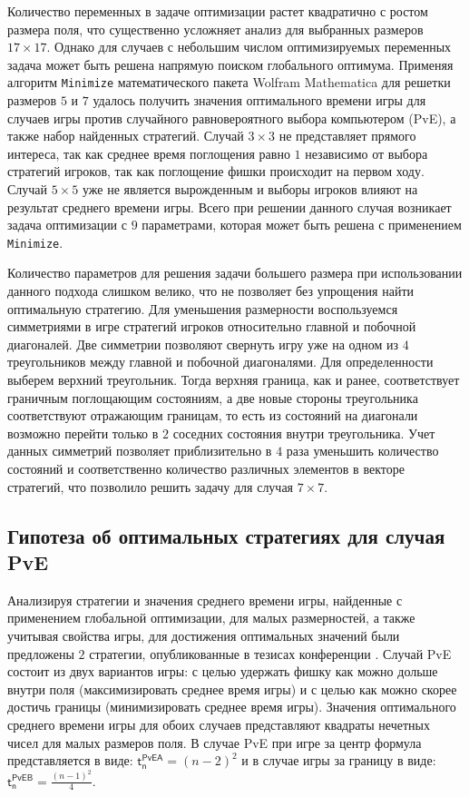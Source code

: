 Количество переменных в задаче оптимизации растет квадратично с ростом размера поля, что существенно усложняет анализ для выбранных размеров $17 \times 17$. Однако для случаев с небольшим числом оптимизируемых переменных задача может быть решена напрямую поиском глобального оптимума. Применяя алгоритм \texttt{Minimize} математического пакета Wolfram Mathematica для решетки размеров $5$ и $7$ удалось получить значения оптимального времени игры для случаев игры против случайного равновероятного выбора компьютером (PvE), а также набор найденных стратегий. Случай $3 \times 3$ не представляет прямого интереса, так как среднее время поглощения равно $1$ независимо от выбора стратегий игроков, так как поглощение фишки происходит на первом ходу. Случай $5 \times 5$ уже не является вырожденным и выборы игроков влияют на результат среднего времени игры. Всего при решении данного случая возникает задача оптимизации с $9$ параметрами, которая может быть решена с применением \texttt{Minimize}.

Количество параметров для решения задачи большего размера при использовании данного подхода слишком велико, что не позволяет без упрощения найти оптимальную стратегию. Для уменьшения размерности воспользуемся симметриями в игре стратегий игроков относительно главной и побочной диагоналей. Две симметрии позволяют свернуть игру уже на одном из $4$ треугольников между главной и побочной диагоналями. Для определенности выберем верхний треугольник. Тогда верхняя граница, как и ранее, соответствует граничным поглощающим состояниям, а две новые стороны треугольника соответствуют отражающим границам, то есть из состояний на диагонали возможно перейти только в $2$ соседних состояния внутри треугольника. Учет данных симметрий позволяет приблизительно в $4$ раза уменьшить количество состояний и соответственно количество различных элементов в векторе стратегий, что позволило решить задачу для случая $7 \times 7$. 

\subsection{Гипотеза об оптимальных стратегиях для случая PvE}\label{subsec:ch3/sec3/sub3}

Анализируя стратегии и значения среднего времени игры, найденные с применением глобальной оптимизации, для малых размерностей, а также учитывая свойства игры, для достижения оптимальных значений были предложены $2$ стратегии, опубликованные в тезисах конференции \cite{confbib1}. Случай PvE состоит из двух вариантов игры: с целью удержать фишку как можно дольше внутри поля (максимизировать среднее время игры) и с целью как можно скорее достичь границы (минимизировать среднее время игры). Значения оптимального среднего времени игры для обоих случаев представляют квадраты нечетных чисел для малых размеров поля. В случае PvE при игре за центр формула представляется в виде: $\boldsymbol{\mathsf{t_n^{PvE A}}} = (n-2)^2$ и в случае игры за границу в виде: $\boldsymbol{\mathsf{t_n^{PvE B}}} = \frac{(n-1)^2}{4}$. 

